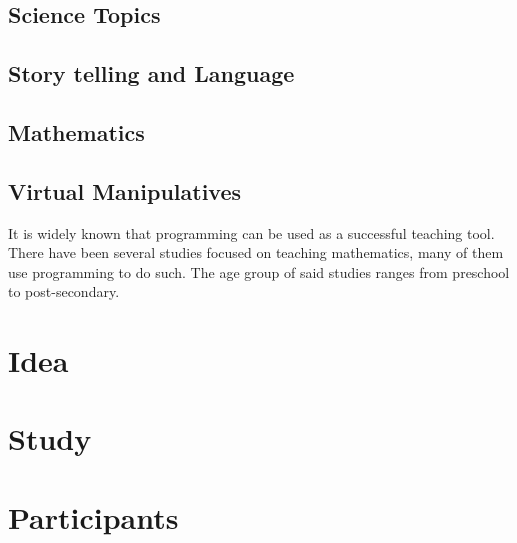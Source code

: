 \documentclass[12pt]{extarticle}
\begin{document}
\subsection{Science Topics} \cite{guzdial}
\subsection{Story telling and Language} \cite{}
\subsection{Mathematics} \cite{}
\subsection{Virtual Manipulatives}\cite{lyeComputation}

It is widely known that programming can be used as a successful teaching tool.
There have been several studies focused on teaching mathematics, many of them use programming to do such.
The age group of said studies ranges from preschool to post-secondary.

\section*{Idea}


\section*{Study}

\section*{Participants}
\end{document}
